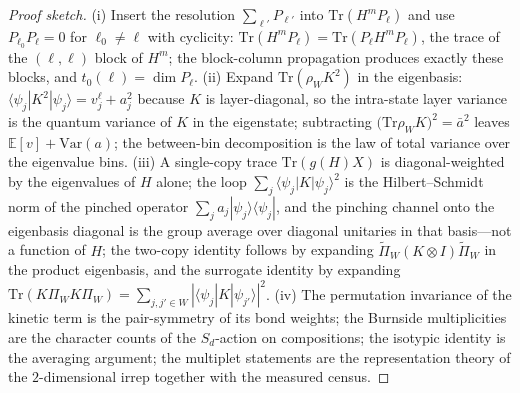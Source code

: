 \begin{proof}[Proof sketch]
(i) Insert the resolution $\sum_{\ell'}P_{\ell'}$ into
$\mathrm{Tr}(H^{m}P_{\ell})$ and use
$P_{\ell_0}P_{\ell}=0$ for $\ell_0\neq\ell$ with cyclicity:
$\mathrm{Tr}(H^{m}P_{\ell})=\mathrm{Tr}(P_{\ell}H^{m}P_{\ell})$, the
trace of the $(\ell,\ell)$ block of $H^{m}$; the block-column
propagation produces exactly these blocks, and
$t_0(\ell)=\dim P_{\ell}$. (ii) Expand
$\mathrm{Tr}(\rho_WK^{2})$ in the eigenbasis:
$\langle\psi_j|K^{2}|\psi_j\rangle=v^{\ell}_j+a_j^{2}$ because $K$ is
layer-diagonal, so the intra-state layer variance is the quantum variance
of $K$ in the eigenstate; subtracting
$\bigl(\mathrm{Tr}\rho_WK\bigr)^{2}=\bar a^{2}$ leaves
$\mathbb{E}[v]+\mathrm{Var}(a)$; the between-bin decomposition is the
law of total variance over the eigenvalue bins. (iii) A single-copy trace
$\mathrm{Tr}(g(H)X)$ is diagonal-weighted by the eigenvalues of $H$ alone;
the loop $\sum_j\langle\psi_j|K|\psi_j\rangle^{2}$ is the Hilbert--Schmidt
norm of the pinched operator $\sum_j a_j|\psi_j\rangle\langle\psi_j|$,
and the pinching channel onto the eigenbasis diagonal is the group average
over diagonal unitaries in that basis---not a function of $H$; the
two-copy identity follows by expanding
$\widetilde{\Pi}_{W}(K\otimes I)\widetilde{\Pi}_{W}$ in the product
eigenbasis, and the surrogate identity by expanding
$\mathrm{Tr}(K\Pi_WK\Pi_W)=\sum_{j,j'\in W}
|\langle\psi_j|K|\psi_{j'}\rangle|^{2}$. (iv) The permutation invariance
of the kinetic term is the pair-symmetry of its bond weights; the Burnside
multiplicities are the character counts of the $S_d$-action on
compositions; the isotypic identity is the averaging argument; the
multiplet statements are the representation theory of the $2$-dimensional
irrep together with the measured census.
\end{proof}

